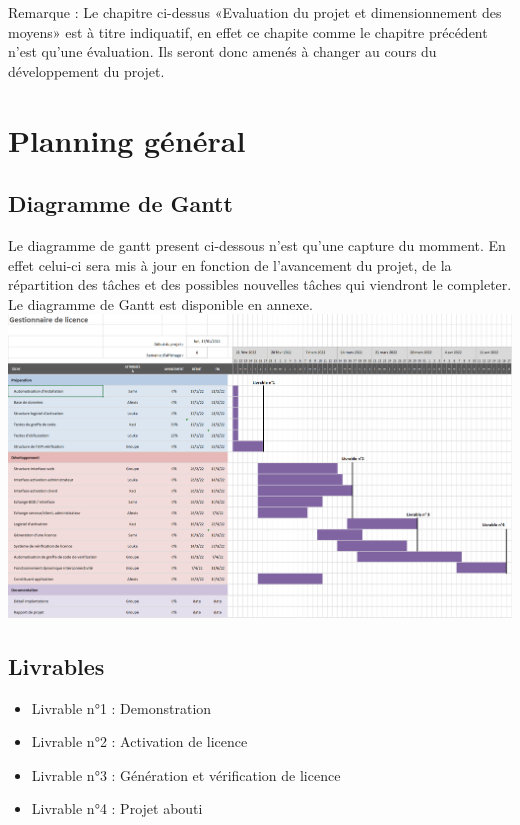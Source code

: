 	Remarque : Le chapitre ci-dessus «Evaluation du projet et dimensionnement des moyens» est à titre indiquatif, en effet ce chapite comme le chapitre précédent 
	n'est qu'une évaluation. Ils seront donc amenés à changer au cours du développement du projet.

\chapter{Planning général}
\section{Diagramme de Gantt}

Le diagramme de gantt present ci-dessous n'est qu'une capture du momment. En effet celui-ci sera mis à jour en fonction de l'avancement
du projet, de la répartition des tâches et des possibles nouvelles tâches qui viendront le completer. \\

Le diagramme de Gantt est disponible en annexe.\\ \newline
\includegraphics[width=17cm]{Gantt.png}

\section{Livrables}
\begin{itemize}
	\item Livrable n°1 : Demonstration
	\item Livrable n°2 : Activation de licence
	\item Livrable n°3 : Génération et vérification de licence
	\item Livrable n°4 : Projet abouti
\end{itemize}

